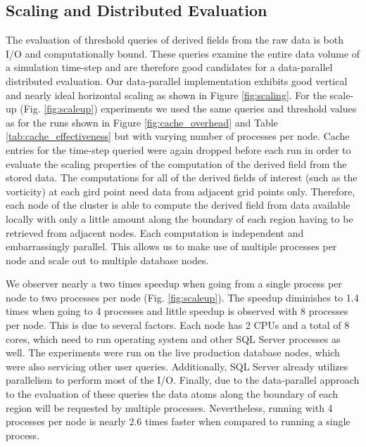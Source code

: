 \documentclass{sig-alternate}
\begin{document}
\subsection{Scaling and Distributed Evaluation}
The evaluation of threshold queries of derived fields from the raw data is both I/O and computationally bound. These queries examine the entire data
volume of a simulation time-step and are therefore good candidates for a data-parallel distributed evaluation. 
Our data-parallel implementation exhibits good vertical and nearly ideal horizontal scaling as shown in Figure \ref{fig:scaling}. 
For the scale-up (Fig. \ref{fig:scaleup}) experiments we used the same
queries and threshold values as for the runs shown in Figure \ref{fig:cache_overhead} and Table \ref{tab:cache_effectiveness} 
but with varying number of processes per node. Cache entries for the
time-step queried were again dropped before each run in order to evaluate the scaling properties of the computation of the derived field from the stored data.
The computations for all of 
the derived fields of interest (such as the vorticity) at each gird point need data from adjacent grid points only. Therefore, each node of the cluster is able to
compute the derived field from data available locally with only a little amount along the boundary of each region having to be retrieved from adjacent nodes.
Each computation is independent and embarrassingly parallel. This allows us to make use of multiple processes per node and scale out to
multiple database nodes.

We observer nearly a two times speedup when going from a single process per node to two processes per node (Fig. \ref{fig:scaleup}). 
The speedup diminishes to 1.4 times when going to 4 processes and little speedup is 
observed with 8 processes per node. This is due to several factors. Each node has 2 CPUs and a total of 8 cores, which need to run operating system and other SQL Server
processes as well. The experiments were run on the live production database nodes, which were also servicing other user queries. Additionally, SQL
Server already utilizes parallelism to perform most of the I/O. Finally, due to the data-parallel approach to the evaluation of these queries the data atoms along
the boundary of each region will be requested by multiple processes. Nevertheless, running with 4 processes per node is nearly 2.6 times faster when
compared to running a single process.
\end{document}
